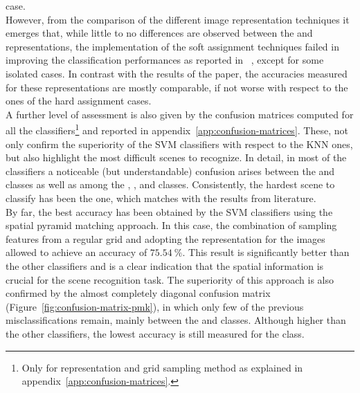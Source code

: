 \documentclass[../main.tex]{subfiles}
\begin{document}
case.\\
However, from the comparison of the different image representation techniques it
emerges that, while little to no differences are observed between the
 and  representations, the implementation of the soft
assignment techniques failed in improving the classification performances as
reported in ~\cite{gemert}, except for some
isolated cases. In contrast with the results of the paper, the accuracies
measured for these representations are mostly comparable, if not worse with respect
to the ones of the hard assignment cases.\\
A further level of assessment is also given by the confusion matrices computed
for all the classifiers\footnote{Only for  representation and grid
	sampling method as explained in appendix~\ref{app:confusion-matrices}.} and reported in appendix~\ref{app:confusion-matrices}.
These, not only confirm the superiority of the SVM classifiers with respect to
the KNN ones, but also highlight the most difficult scenes to
recognize. In detail, in most of the classifiers a noticeable
(but understandable) confusion arises between the  and
 classes as well as among the , ,
 and  classes. Consistently, the hardest scene
to classify has been the  one, which matches with the results
from literature.\\
By far, the best accuracy has been obtained by the SVM classifiers
using the spatial pyramid matching approach. In this case, the combination of  sampling features
from a regular grid and adopting the  representation for the images
allowed to achieve an accuracy of $\SI{75.54}{\percent}$. This result is
significantly better than the other classifiers and is a clear indication that
the spatial information is crucial for the scene recognition task. The
superiority of this approach is also confirmed by the almost completely diagonal
confusion matrix (Figure~\ref{fig:confusion-matrix-pmk}), in which only few of
the previous misclassifications remain, mainly between the  and
 classes. Although higher than the other classifiers, the lowest
accuracy is still measured for the  class.\\
\end{document}
